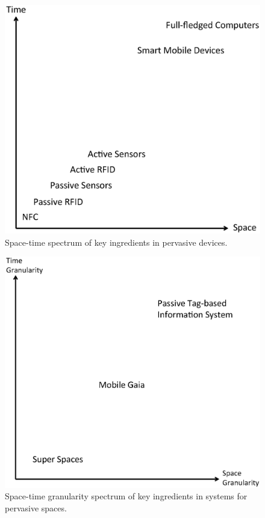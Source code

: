 \begin{figure}
\centering
\includegraphics[width=5in, viewport=0 0 575 550, clip]{Chapter_1_Figures/Devices_Spectrum.eps}
\caption{Space-time spectrum of key ingredients in pervasive devices.}
\label{Figure: Devices_Spectrum.eps}
\end{figure}

\begin{figure}
\centering
\includegraphics[width=5in, viewport=0 0 575 550, clip]{Chapter_1_Figures/Granularity_Spectrum.eps}
\caption{Space-time granularity spectrum of key ingredients in systems for pervasive spaces.}
\label{Figure: Granularity_Spectrum.eps}
\end{figure}


